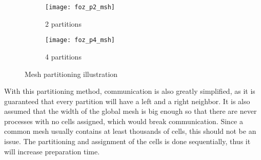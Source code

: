 \begin{figure}[!htp]
	\begin{subfigure}[b]{0.5\columnwidth}
		\centering
		\texttt{[image: foz\_p2\_msh]}
		\caption{2 partitions}
		\label{fig:foz_p2_msh}
	\end{subfigure}%
	\begin{subfigure}[b]{0.5\columnwidth}
		\centering
		\texttt{[image: foz\_p4\_msh]}
		\caption{4 partitions}
		\label{fig:foz_p4_msh}
	\end{subfigure}%

	\caption{Mesh partitioning illustration}
	\label{fig:partitioning}
\end{figure}

With this partitioning method, communication is also greatly simplified, as it is guaranteed that every partition will have a left and a right neighbor.
It is also assumed that the width of the global mesh is big enough so that there are never processes with no cells assigned, which would break communication.
Since a common mesh usually contains at least thousands of cells, this should not be an issue.
The partitioning and assignment of the cells is done sequentially, thus it will increase preparation time.
